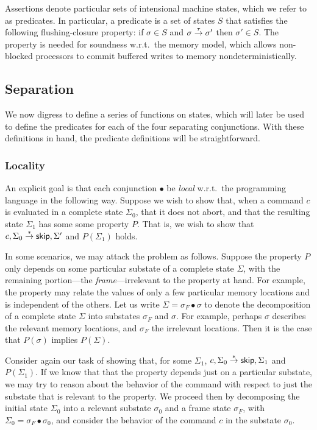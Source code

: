\documentclass[11pt]{report}
\begin{document}
Assertions denote particular sets of intensional machine states, which we refer to as predicates. In particular, a predicate is a set of states $S$ that satisfies the following flushing-closure property: if $\sigma \in S$ and $\sigma \stackrel{\tau}{\rightarrow} \sigma'$ then $\sigma' \in S$. The property is needed for soundness w.r.t.\ the memory model, which allows non-blocked processors to commit buffered writes to memory nondeterministically.  

\subsection{Separation}

We now digress to define a series of functions on states, which will later be used to define the predicates for each of the four separating conjunctions. With these definitions in hand, the predicate definitions will be straightforward.

\subsubsection{Locality}

An explicit goal is that each conjunction $\bullet$ be \emph{local} w.r.t.\ the programming language in the following way. Suppose we wish to show that, when a command $c$ is evaluated in a complete state $\Sigma_0$, that it does not abort, and that the resulting state $\Sigma_1$ has some some property $P$. That is, we wish to show that $c,\Sigma_0 \stackrel{\ast}{\rightarrow} \operatorname{\mathsf{skip}},\Sigma'$ and $P(\Sigma_1)$ holds. 

In some scenarios, we may attack the problem as follows. Suppose the property $P$ only depends on some particular substate of a complete state $\Sigma$, with the remaining portion---the \emph{frame}---irrelevant to the property at hand. For example, the property may relate the values of only a few particular memory locations and is independent of the others. Let us write $\Sigma = \sigma_F \bullet \sigma$ to denote the decomposition of a complete state $\Sigma$ into substates $\sigma_F$ and $\sigma$. For example, perhaps $\sigma$ describes the relevant memory locations, and $\sigma_F$ the irrelevant locations. Then it is the case that $P(\sigma)$ implies $P(\Sigma)$. 

Consider again our task of showing that, for some $\Sigma_1$, $c,\Sigma_0 \stackrel{\ast}{\rightarrow} \operatorname{\mathsf{skip}},\Sigma_1$ and $P(\Sigma_1)$. If we know that that the property depends just on a particular substate, we may try to reason about the behavior of the command with respect to just the substate that is relevant to the property. We proceed then by decomposing the initial state $\Sigma_0$ into a relevant substate $\sigma_0$ and a frame state $\sigma_F$, with $\Sigma_0 = \sigma_F \bullet \sigma_0$, and consider the behavior of the command $c$ in the substate $\sigma_0$. 
\end{document}
